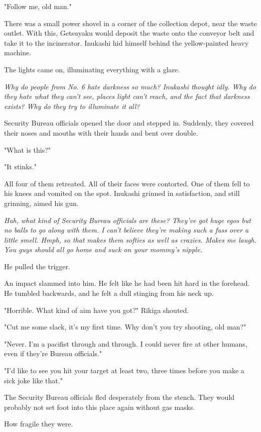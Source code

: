 "Follow me, old man."

There was a small power shovel in a corner of the collection depot, near
the waste outlet. With this, Getsuyaku would deposit the waste onto the
conveyor belt and take it to the incinerator. Inukashi hid himself
behind the yellow-painted heavy machine.

The lights came on, illuminating everything with a glare.

\emph{Why do people from No. 6 hate darkness so much? Inukashi thought idly.
	Why do they hate what they can't see, places light can't reach, and the
	fact that darkness exists? Why do they try to illuminate it all?}

Security Bureau officials opened the door and stepped in. Suddenly, they
covered their noses and mouths with their hands and bent over double.

"What is this?"

"It stinks."

All four of them retreated. All of their faces were contorted. One of
them fell to his knees and vomited on the spot. Inukashi grinned in
satisfaction, and still grinning, aimed his gun.

\emph{Hah, what kind of Security Bureau officials are these? They've got huge
	egos but no balls to go along with them. I can't believe they're making
	such a fuss over a little smell. Hmph, so that makes them softies as
	well as crazies. Makes me laugh. You guys should all go home and suck on
	your mommy's nipple.}

He pulled the trigger.

An impact slammed into him. He felt like he had been hit hard in the
forehead. He tumbled backwards, and he felt a dull stinging from his
neck up.

"Horrible. What kind of aim have you got?" Rikiga shouted.

"Cut me some slack, it's my first time. Why don't you try shooting, old
man?"

"Never. I'm a pacifist through and through. I could never fire at other
humans, even if they're Bureau officials."

"I'd like to see you hit your target at least two, three times before
you make a sick joke like that."

The Security Bureau officials fled desperately from the stench. They
would probably not set foot into this place again without gas masks.

How fragile they were.


